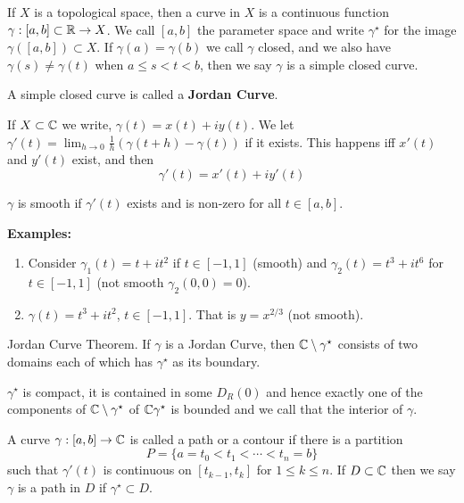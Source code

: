 \documentclass[12pt]{article}
\begin{document}
\begin{definition}
    If $X$ is a topological space, then a curve in $X$ is a continuous function $\gamma: [a,b] \subset \mathbb R \to X$. We call $[a,b]$ the parameter space and write $\gamma^\star$ for the image $\gamma([a,b])\subset X$. If $\gamma(a) = \gamma(b)$ we call $\gamma$ closed, and we also have $\gamma(s) \neq \gamma(t)$ when $a \leq s < t < b$, then we say $\gamma$ is a simple closed curve. 

    A simple closed curve is called a \textbf{Jordan Curve}. 

    If $X \subset \mathbb C$ we write, $\gamma(t) = x(t) + iy(t)$. 
    We let $\gamma'(t) = \lim_{h\to 0} \frac{1}{h} (\gamma(t+h) - \gamma(t))$ if it exists. This happens iff $x'(t)$ and $y'(t)$ exist, and then 
    \[\gamma'(t) = x'(t) + iy'(t)\]
\end{definition}

\begin{definition}
    $\gamma$ is smooth if $\gamma'(t)$ exists and is non-zero for all $t \in [a,b]$. 
\end{definition}

\textbf{Examples:} 

\begin{enumerate}
    \item Consider $\gamma_1(t) = t + it^2$ if $t \in [-1,1]$ (smooth) and $\gamma_2(t) = t^3 + it^6$ for $t \in [-1,1]$ (not smooth $\gamma_2(0,0) = 0$). 
    \item  $\gamma(t) = t^3 + it^2$, $t \in [-1, 1]$. That is $y = x^{2/3}$ (not smooth). 
\end{enumerate}

\begin{theorem}{Jordan Curve Theorem.}
    If $\gamma$ is a Jordan Curve, then $\mathbb C \setminus \gamma^\star$ consists of two domains each of which has $\gamma ^\star$ as its boundary. 
\end{theorem}

\begin{remark}
    $\gamma^\star$ is compact, it is contained in some $D_R(0)$ and hence exactly one of the components of $\mathbb C \setminus \gamma^\star$ of $\mathbb C \gamma ^\star$ is bounded and we call that the interior of $\gamma$. 
\end{remark}

\begin{definition}
    A curve $\gamma: [a, b] \to \mathbb C$ is called a path or a contour if there is a partition 
    \[P = \{a = t_0 < t_1 < \cdots < t_n =b\}\]
    such that $\gamma'(t)$ is continuous on $[t_{k-1}, t_k]$ for $1 \leq k \leq n$. If $D \subset \mathbb C$ then we say $\gamma$ is a path in $D$ if $\gamma^\star \subset D$. 
\end{definition}
\end{document}
